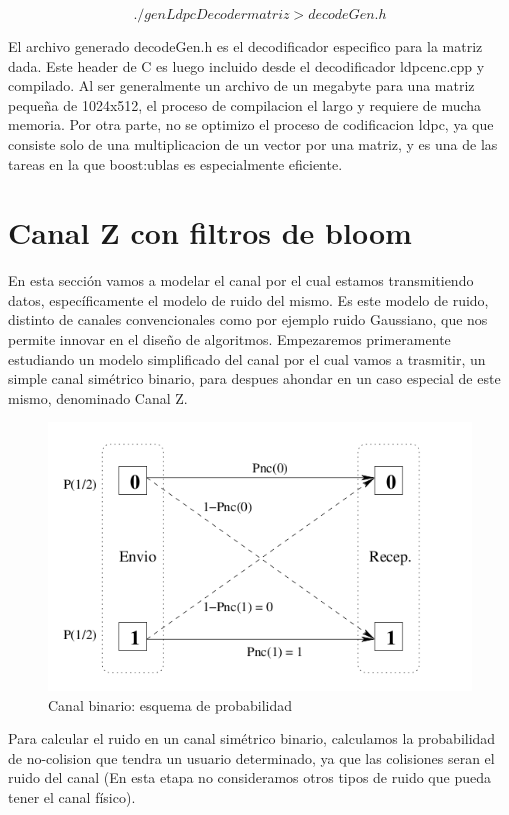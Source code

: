 $$ ./genLdpcDecoder matriz  > decodeGen.h $$

El archivo generado decodeGen.h es el decodificador especifico para la matriz dada. Este header de C es luego incluido desde el decodificador ldpcenc.cpp y compilado. Al ser generalmente un archivo de un megabyte para una matriz pequeña de 1024x512, el proceso de compilacion el largo y requiere de mucha memoria.
Por otra parte, no se optimizo el proceso de codificacion ldpc, ya que consiste solo de una multiplicacion de un vector por una matriz, y es una de las tareas en la que boost:ublas es especialmente eficiente.

\section{Canal Z con filtros de bloom}
En esta sección vamos a modelar el canal por el cual estamos transmitiendo datos, específicamente el modelo de ruido del mismo. Es este modelo de ruido, distinto de canales convencionales como por ejemplo ruido Gaussiano, que nos permite innovar en el diseño de algoritmos.
Empezaremos primeramente estudiando un modelo simplificado del canal por el cual vamos a trasmitir, un simple canal simétrico binario, para despues ahondar en un caso especial de este mismo, denominado Canal Z.
\begin{figure}[t]
  \begin{center}
    \includegraphics[scale=0.43]{capacidad/canalBinario.png}
  \end{center}
\caption {Canal binario: esquema de probabilidad}
\label{fig:canbin}
\end{figure}

Para calcular el ruido en un canal simétrico binario, calculamos la probabilidad de no-colision que tendra un usuario determinado, ya que las colisiones seran el ruido del canal (En esta etapa no consideramos otros tipos de ruido que pueda tener el canal físico).

